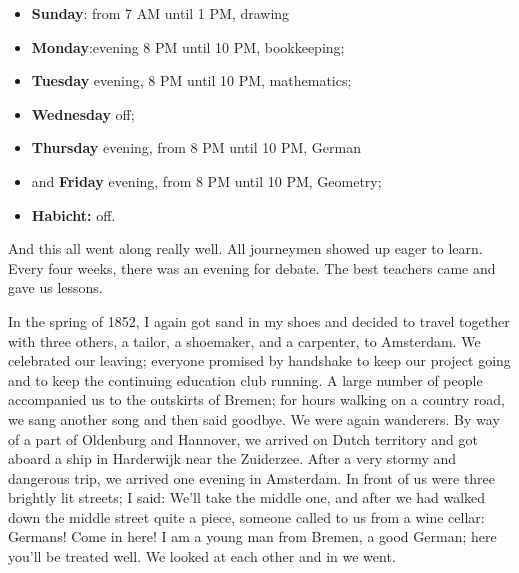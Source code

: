 \documentclass{article}
\providecommand{\tightlist}{%
  \setlength{\itemsep}{0pt}\setlength{\parskip}{0pt}}
\begin{document}
\begin{itemize}
\tightlist
\item
  \textbf{Sunday}: from 7 AM until 1 PM, drawing
\item
  \textbf{Monday}:evening 8 PM until 10 PM, bookkeeping;
\item
  \textbf{Tuesday} evening, 8 PM until 10 PM, mathematics;
\item
  \textbf{Wednesday} off;
\item
  \textbf{Thursday} evening, from 8 PM until 10 PM, German
\item
  and \textbf{Friday} evening, from 8 PM until 10 PM, Geometry;
\item
  \textbf{Habicht:} off.
\end{itemize}

And this all went along really well. All journeymen showed up eager to learn. Every four weeks, there was an evening for debate. The best teachers came and gave us lessons.

In the spring of 1852, I again got sand in my shoes and decided to travel together with three others, a tailor, a shoemaker, and a carpenter, to Amsterdam. We celebrated our leaving; everyone promised by handshake to keep our project going and to keep the continuing education club running. A large number of people accompanied us to the outskirts of Bremen; for hours walking on a country road, we sang another song and then said goodbye. We were again wanderers. By way of a part of Oldenburg and Hannover, we arrived on Dutch territory and got aboard a ship in Harderwijk near the Zuiderzee. After a very stormy and dangerous trip, we arrived one evening in Amsterdam. In front of us were three brightly lit streets; I said: We'll take the middle one, and after we had walked down the middle street quite a piece, someone called to us from a wine cellar: Germans! Come in here! I am a young man from Bremen, a good German; here you'll be treated well. We looked at each other and in we went.
\end{document}
